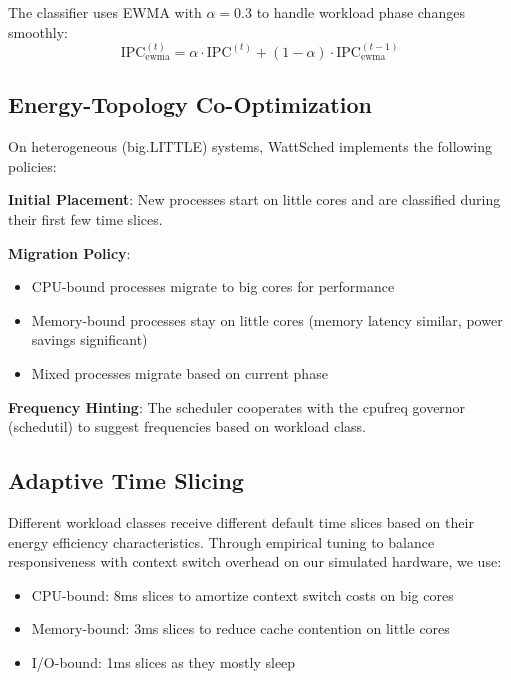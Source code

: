 \documentclass{article}
\begin{document}
The classifier uses EWMA with $\alpha = 0.3$ to handle workload phase changes smoothly:
\begin{equation}
\text{IPC}_{\text{ewma}}^{(t)} = \alpha \cdot \text{IPC}^{(t)} + (1-\alpha) \cdot \text{IPC}_{\text{ewma}}^{(t-1)}
\end{equation}

\subsection{Energy-Topology Co-Optimization}

On heterogeneous (big.LITTLE) systems, WattSched implements the following policies:

\textbf{Initial Placement}: New processes start on little cores and are classified during their first few time slices.

\textbf{Migration Policy}: 
\begin{itemize}
    \item CPU-bound processes migrate to big cores for performance
    \item Memory-bound processes stay on little cores (memory latency similar, power savings significant)
    \item Mixed processes migrate based on current phase
\end{itemize}

\textbf{Frequency Hinting}: The scheduler cooperates with the cpufreq governor (schedutil) to suggest frequencies based on workload class.

\subsection{Adaptive Time Slicing}
\label{sec:time_slices}

Different workload classes receive different default time slices based on their energy efficiency characteristics. Through empirical tuning to balance responsiveness with context switch overhead on our simulated hardware, we use:

\begin{itemize}
    \item CPU-bound: 8ms slices to amortize context switch costs on big cores
    \item Memory-bound: 3ms slices to reduce cache contention on little cores
    \item I/O-bound: 1ms slices as they mostly sleep
\end{itemize}
\end{document}
